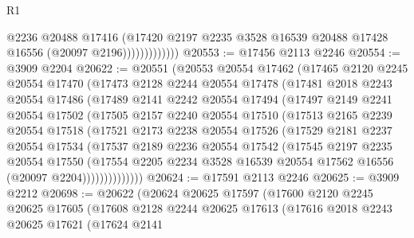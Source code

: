 \begin{lexlean}{R1}
\begin{coremodule}
                          @2236
                          @20488
                          @17416
                          (@17420
                            @2197
                            @2235
                            @3528
                            @16539
                            @20488
                            @17428
                            @16556
                            (@20097 @2196)))))))))))))
@20553 := @17456 @2113 @2246
@20554 := @3909 @2204
@20622 := @20551
    (@20553
      @20554
      @17462
      (@17465
        @2120
        @2245
        @20554
        @17470
        (@17473
          @2128
          @2244
          @20554
          @17478
          (@17481
            @2018
            @2243
            @20554
            @17486
            (@17489
              @2141
              @2242
              @20554
              @17494
              (@17497
                @2149
                @2241
                @20554
                @17502
                (@17505
                  @2157
                  @2240
                  @20554
                  @17510
                  (@17513
                    @2165
                    @2239
                    @20554
                    @17518
                    (@17521
                      @2173
                      @2238
                      @20554
                      @17526
                      (@17529
                        @2181
                        @2237
                        @20554
                        @17534
                        (@17537
                          @2189
                          @2236
                          @20554
                          @17542
                          (@17545
                            @2197
                            @2235
                            @20554
                            @17550
                            (@17554
                              @2205
                              @2234
                              @3528
                              @16539
                              @20554
                              @17562
                              @16556
                              (@20097 @2204))))))))))))))
@20624 := @17591 @2113 @2246
@20625 := @3909 @2212
@20698 := @20622
    (@20624
      @20625
      @17597
      (@17600
        @2120
        @2245
        @20625
        @17605
        (@17608
          @2128
          @2244
          @20625
          @17613
          (@17616
            @2018
            @2243
            @20625
            @17621
            (@17624
              @2141

\end{coremodule}
\end{lexlean}
